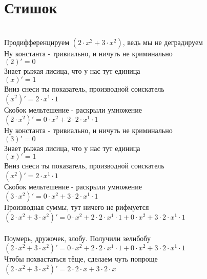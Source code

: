 \documentclass[a4paper,12pt]{article}
\begin{document}
\section*{Стишок}\\
Продифференцируем $(2 \cdot x ^{2}  + 3 \cdot x ^{2} )$, ведь мы не деградируем\\
Ну константа - тривиально, и ничуть не криминально\\
\begin{math}
	(2)' = 0
\end{math}\\
Знает рыжая лисица, что у нас тут единица\\
\begin{math}
	(x)' = 1
\end{math}\\
Вниз снеси ты показатель, производной соискатель\\
\begin{math}
	(x ^{2} )' = 2 \cdot x ^{1}  \cdot 1
\end{math}\\
Скобок мельтешение - раскрыли умножение\\
\begin{math}
	(2 \cdot x ^{2} )' = 0 \cdot x ^{2}  + 2 \cdot 2 \cdot x ^{1}  \cdot 1
\end{math}\\
Ну константа - тривиально, и ничуть не криминально\\
\begin{math}
	(3)' = 0
\end{math}\\
Знает рыжая лисица, что у нас тут единица\\
\begin{math}
	(x)' = 1
\end{math}\\
Вниз снеси ты показатель, производной соискатель\\
\begin{math}
	(x ^{2} )' = 2 \cdot x ^{1}  \cdot 1
\end{math}\\
Скобок мельтешение - раскрыли умножение\\
\begin{math}
	(3 \cdot x ^{2} )' = 0 \cdot x ^{2}  + 3 \cdot 2 \cdot x ^{1}  \cdot 1
\end{math}\\
Производная суммы, тут ничего не рифмуется\\
\begin{math}
	(2 \cdot x ^{2}  + 3 \cdot x ^{2} )' = 0 \cdot x ^{2}  + 2 \cdot 2 \cdot x ^{1}  \cdot 1 + 0 \cdot x ^{2}  + 3 \cdot 2 \cdot x ^{1}  \cdot 1
\end{math}\\
\\Поумерь, дружочек, злобу. Получили зелибобу\\ $(2 \cdot x ^{2}  + 3 \cdot x ^{2} )' = 0 \cdot x ^{2}  + 2 \cdot 2 \cdot x ^{1}  \cdot 1 + 0 \cdot x ^{2}  + 3 \cdot 2 \cdot x ^{1}  \cdot 1$\\
Чтобы похвастаться тёще, сделаем чуть попроще\\
$(2 \cdot x ^{2}  + 3 \cdot x ^{2} )' = 2 \cdot 2 \cdot x + 3 \cdot 2 \cdot x$\\
\end{document}
